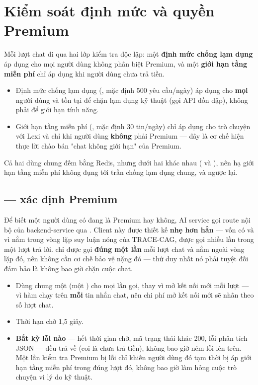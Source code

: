 \section{Kiểm soát định mức và quyền Premium}

Mỗi lượt chat đi qua hai lớp kiểm tra độc lập: một \textbf{định mức chống lạm dụng} áp
dụng cho mọi người dùng không phân biệt Premium, và một \textbf{giới hạn tầng miễn phí}
chỉ áp dụng khi người dùng chưa trả tiền.

\begin{itemize}[leftmargin=1.4em]
  \item Định mức chống lạm dụng (, mặc định 500 yêu cầu/ngày)
  áp dụng cho \textbf{mọi} người dùng và tồn tại để chặn lạm dụng kỹ thuật (gọi API dồn
  dập), không phải để giới hạn tính năng.
  \item Giới hạn tầng miễn phí (, mặc định 30
  tin/ngày) chỉ áp dụng cho trò chuyện với Lexi và chỉ khi người dùng \textbf{không} phải
  Premium — đây là cơ chế hiện thực lời chào bán "chat không giới hạn" của Premium.
\end{itemize}

Cả hai dùng chung  đếm bằng Redis, nhưng dưới hai
 khác nhau ( và ), nên hạ
giới hạn tầng miễn phí không đụng tới trần chống lạm dụng chung, và ngược lại.

\subsection{ — xác định Premium}

Để biết một người dùng có đang là Premium hay không, AI service gọi route nội bộ của
backend-service qua . Client này được thiết kế
\textbf{nhẹ hơn hẳn}  — vốn có  và
 vì nằm trong vòng lặp suy luận nóng của TRACE-CAG, được gọi nhiều lần trong
một lượt trả lời.  chỉ được gọi \textbf{đúng một lần} mỗi lượt
chat và nằm ngoài vòng lặp đó, nên không cần cơ chế bảo vệ nặng đó — thứ duy nhất nó phải
tuyệt đối đảm bảo là không bao giờ chặn cuộc chat.

\begin{itemize}[leftmargin=1.4em]
  \item Dùng chung một  (một ) cho mọi lần
  gọi, thay vì mở kết nối mới mỗi lượt — vì hàm  chạy trên
  \textbf{mỗi} tin nhắn chat, nên chi phí mở kết nối mới sẽ nhân theo số lượt chat.
  \item Thời hạn chờ 1,5 giây.
  \item \textbf{Bất kỳ lỗi nào} — hết thời gian chờ, mã trạng thái khác 200, lỗi phân
  tích JSON — đều trả về  (coi là chưa trả tiền), không bao giờ ném lỗi lên
  trên. Một lần kiểm tra Premium bị lỗi chỉ khiến người dùng đó tạm thời bị áp giới hạn
  tầng miễn phí trong đúng lượt đó, không bao giờ làm hỏng cuộc trò chuyện vì lý do kỹ
  thuật.
\end{itemize}

